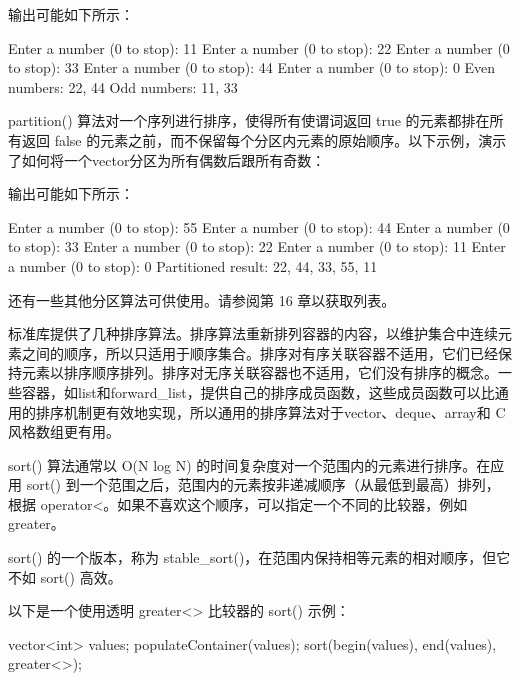 输出可能如下所示：

\begin{shell}
Enter a number (0 to stop): 11
Enter a number (0 to stop): 22
Enter a number (0 to stop): 33
Enter a number (0 to stop): 44
Enter a number (0 to stop): 0
Even numbers: 22, 44
Odd numbers: 11, 33
\end{shell}

partition() 算法对一个序列进行排序，使得所有使谓词返回 true 的元素都排在所有返回 false 的元素之前，而不保留每个分区内元素的原始顺序。以下示例，演示了如何将一个vector分区为所有偶数后跟所有奇数：


输出可能如下所示：

\begin{shell}
Enter a number (0 to stop): 55
Enter a number (0 to stop): 44
Enter a number (0 to stop): 33
Enter a number (0 to stop): 22
Enter a number (0 to stop): 11
Enter a number (0 to stop): 0
Partitioned result: 22, 44, 33, 55, 11
\end{shell}

还有一些其他分区算法可供使用。请参阅第 16 章以获取列表。


标准库提供了几种排序算法。排序算法重新排列容器的内容，以维护集合中连续元素之间的顺序，所以只适用于顺序集合。排序对有序关联容器不适用，它们已经保持元素以排序顺序排列。排序对无序关联容器也不适用，它们没有排序的概念。一些容器，如list和forward\_list，提供自己的排序成员函数，这些成员函数可以比通用的排序机制更有效地实现，所以通用的排序算法对于vector、deque、array和 C 风格数组更有用。

sort() 算法通常以 O(N log N) 的时间复杂度对一个范围内的元素进行排序。在应用 sort() 到一个范围之后，范围内的元素按非递减顺序（从最低到最高）排列，根据 operator<。如果不喜欢这个顺序，可以指定一个不同的比较器，例如 greater。

sort() 的一个版本，称为 stable\_sort()，在范围内保持相等元素的相对顺序，但它不如 sort() 高效。

以下是一个使用透明 greater<> 比较器的 sort() 示例：

\begin{cpp}
vector<int> values;
populateContainer(values);
sort(begin(values), end(values), greater<>{});
\end{cpp}

